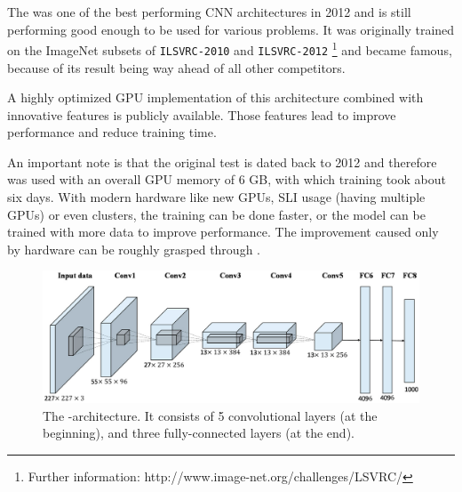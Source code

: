The \textit{\alexnet} was one of the best performing CNN architectures in 2012 and is still performing good enough to be used for various problems. It was originally trained on the ImageNet subsets of \texttt{ILSVRC-2010} and \texttt{ILSVRC-2012} \footnote{Further information: http://www.image-net.org/challenges/LSVRC/} and became famous, because of its result being way ahead of all other competitors.

A highly optimized GPU implementation of this architecture combined with innovative features is publicly available. Those features lead to improve performance and reduce training time.\cite{krizhevsky2012imagenet}

An important note is that the original test is dated back to 2012 and therefore was used with an overall GPU memory of 6 GB, with which training took about six days. With modern hardware like new GPUs, SLI usage (having multiple GPUs) or even clusters, the training can be done faster, or the model can be trained with more data to improve performance. The improvement caused only by hardware can be roughly grasped through \cite{sze2017hardware}.


\begin{figure}[ht]
	\centering
	\includegraphics[scale = 1.3]{src/pic/AlexNet-structure-simple.PNG}
	\caption{The \alexnet-architecture. It consists of 5 convolutional layers (at the beginning), and three fully-connected layers (at the end). \cite{han2017pre}
	\cite{krizhevsky2012imagenet}}
	\label{pic: AlexNet}
\end{figure}